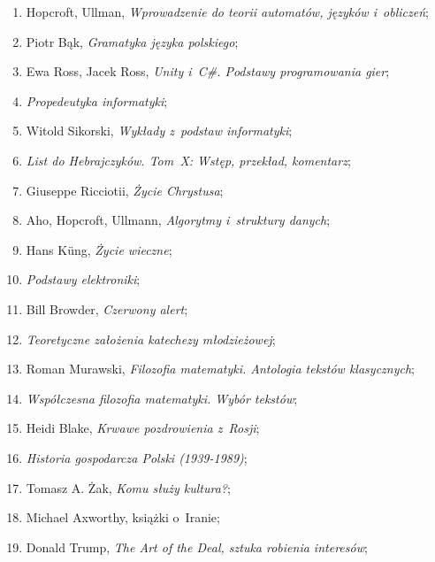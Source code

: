 \documentclass[a4paper,11pt]{article}
\begin{document}
\begin{enumerate}
\item Hopcroft, Ullman, \textit{Wprowadzenie do teorii automatów, języków
    i~obliczeń};

\item Piotr Bąk, \textit{Gramatyka języka polskiego};

\item Ewa Ross, Jacek Ross, \textit{Unity i~C\#. Podstawy programowania
    gier};

\item \textit{Propedeutyka informatyki};

\item Witold Sikorski, \textit{Wykłady z~podstaw informatyki};

\item \textit{List do Hebrajczyków. Tom~X: Wstęp, przekład, komentarz};

\item Giuseppe Ricciotii, \textit{Życie Chrystusa};

\item Aho, Hopcroft, Ullmann, \textit{Algorytmy i~struktury danych};

\item Hans K\"{u}ng, \textit{Życie wieczne};

\item \textit{Podstawy elektroniki};

\item Bill Browder, \textit{Czerwony alert};

\item \textit{Teoretyczne założenia katechezy młodzieżowej};

\item Roman Murawski, \textit{Filozofia matematyki. Antologia tekstów
    klasycznych};

\item \textit{Współczesna filozofia matematyki. Wybór tekstów};

\item Heidi Blake, \textit{Krwawe pozdrowienia z~Rosji};

\item \textit{Historia gospodarcza Polski (1939-1989)};

\item Tomasz A. Żak, \textit{Komu służy kultura?};

\item Michael Axworthy, książki o~Iranie;

\item Donald Trump, \textit{The Art of the Deal, sztuka robienia interesów};


\end{enumerate}
\end{document}
